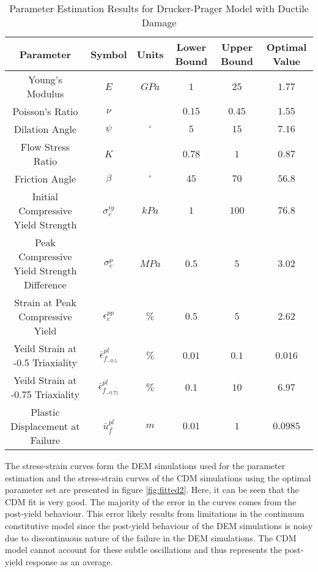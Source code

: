 \begin{table}[]
\centering
\caption{Parameter Estimation Results for Drucker-Prager Model with Ductile Damage}
\label{tab:paramDrucker}
\begin{tabular}{@{}cccccc@{}}
\toprule
Parameter                                  & Symbol                            & Units      & Lower Bound & Upper Bound & Optimal Value \\ \midrule
Young's Modulus                            & $E$                               & $GPa$      & $1$         & $25$        & $1.77$        \\
Poisson's Ratio                            & $\nu$                             &            & $0.15$      & $0.45$      & $1.55$        \\
Dilation Angle                             & $\psi$                            & $^{\circ}$ & $5$         & $15$        & $7.16$        \\
Flow Stress Ratio                          & $K$                               &            & $0.78$      & $1$         & $0.87$        \\
Friction Angle                             & $\beta$                           & $^{\circ}$ & $45$        & $70$        & $56.8$        \\
Initial Compressive Yield Strength         & $\sigma_c^{iy}$                   & $kPa$      & $1$         & $100$       & $76.8$        \\
Peak Compressive Yield Strength Difference & $\sigma_c^{p}$                    & $MPa$      & $0.5$       & $5$         & $3.02$        \\
Strain at Peak Compressive Yield           & $\epsilon_c^{pp}$                 & $\%$       & $0.5$       & $5$         & $2.62$        \\
Yeild Strain at -0.5 Triaxiality           & $\bar{\epsilon}^{pl}_{f_{-0.5}}$  & $\%$       & $0.01$      & $0.1$       & $0.016$       \\
Yeild Strain at -0.75 Triaxiality          & $\bar{\epsilon}^{pl}_{f_{-0.75}}$ & $\%$       & $0.1$       & $10$        & $6.97$        \\
Plastic Displacement at Failure            & $\bar{u}^{pl}_f$                  & $m$        & $0.01$      & $1$         & $0.0985$      \\ \bottomrule
\end{tabular}
\end{table}

The stress-strain curves form the DEM simulations used for the parameter estimation and the stress-strain curves of the CDM simulations using the optimal parameter set are presented in figure \ref{fig:fitted2}. Here, it can be seen that the CDM fit is very good. The majority of the error in the curves comes from the post-yield behaviour. This error likely results from limitations in the continuum constitutive model since the post-yield behaviour of the DEM simulations is noisy due to discontinuous nature of the failure in the DEM simulations. The CDM model cannot account for these subtle oscillations and thus represents the post-yield response as an average. 
